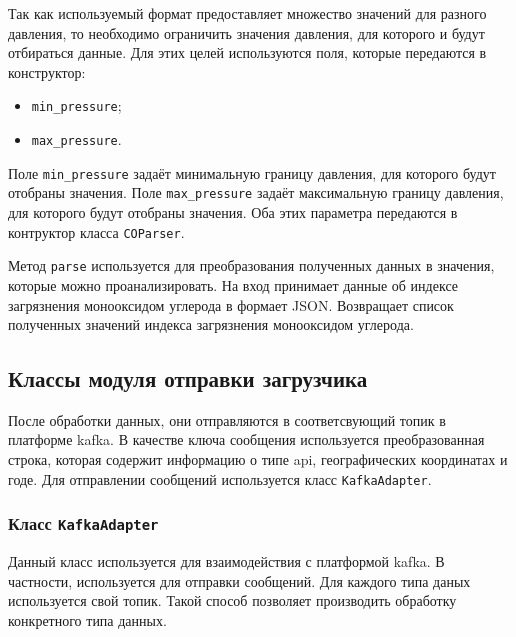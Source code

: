 Так как используемый формат предоставляет множество значений для разного давления, то необходимо ограничить значения давления, для которого и будут отбираться данные.
Для этих целей используются поля, которые передаются в конструктор:
\begin{itemize}
    \item \texttt{min\_pressure};
    \item \texttt{max\_pressure}.
\end{itemize}

Поле \texttt{min\_pressure} задаёт минимальную границу давления, для которого будут отобраны значения.
Поле \texttt{max\_pressure} задаёт максимальную границу давления, для которого будут отобраны значения.
Оба этих параметра передаются в контруктор класса \texttt{COParser}.

Метод \texttt{parse} используется для преобразования полученных данных в значения, которые можно проанализировать.
На вход принимает данные об индексе загрязнения монооксидом углерода в формает JSON.
Возвращает список полученных значений индекса загрязнения монооксидом углерода.



\subsection{Классы модуля отправки загрузчика}
После обработки данных, они отправляются в соответсвующий топик в платформе kafka. 
В качестве ключа сообщения используется преобразованная строка, которая содержит информацию о типе api, географических координатах и годе.
Для отправлении сообщений используется класс \texttt{KafkaAdapter}.

\subsubsection{Класс \texttt{KafkaAdapter}}

Данный класс используется для взаимодействия с платформой kafka.
В частности, используется для отправки сообщений.
Для каждого типа даных используется свой топик.
Такой способ позволяет производить обработку конкретного типа данных.

